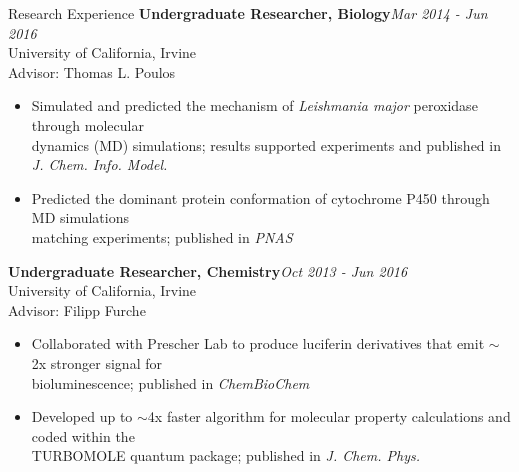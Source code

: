 \documentclass{resume} %
\begin{document}
\begin{rSection}{Research Experience}
\textbf{Undergraduate Researcher, Biology}\hfill {\em Mar 2014 - Jun 2016}\\
University of California, Irvine \\
Advisor: Thomas L. Poulos
\vspace{-0.5em}
\begin{itemize}
\itemsep-0.65em
\item Simulated and predicted the mechanism of \textit{Leishmania major} peroxidase through
  molecular \\
  dynamics (MD) simulations; results supported experiments and published in \textit{J. Chem. Info. Model.}
\item Predicted the dominant protein conformation of cytochrome P450 through
  MD simulations \\
  matching experiments; published in \textit{PNAS}
\end{itemize}

\textbf{Undergraduate Researcher, Chemistry}\hfill {\em Oct 2013 - Jun 2016}\\
University of California, Irvine\\
Advisor: Filipp Furche
\vspace{-0.5em}
\begin{itemize}
\itemsep-0.65em
\item Collaborated with Prescher Lab to produce luciferin derivatives that emit
  $\sim$2x stronger signal for\\
  bioluminescence; published in \textit{ChemBioChem}
\item Developed up to $\sim$4x faster algorithm for molecular property calculations and coded
  within the \\
  TURBOMOLE quantum package; published in \textit{J. Chem. Phys.}
\end{itemize}

\end{rSection}
\end{document}
